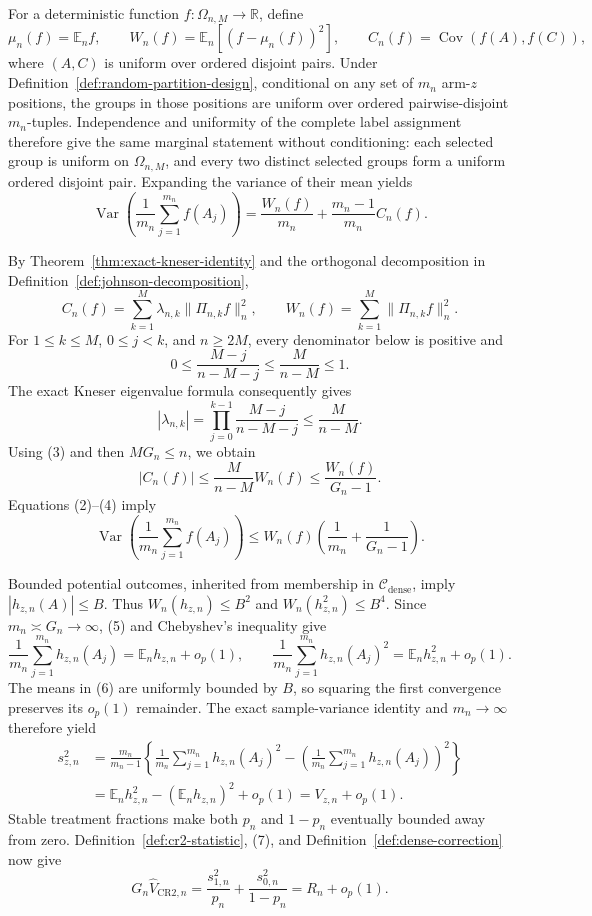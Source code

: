 For a deterministic function \(f:\Omega_{n,M}\to\mathbb R\), define
\[
 \mu_n(f)=\mathbb E_nf,
 \qquad
 W_n(f)=\mathbb E_n\!\left[(f-\mu_n(f))^2\right],
 \qquad
 C_n(f)=\operatorname{Cov}(f(A),f(C)),
 \tag{1}
\]
where \((A,C)\) is uniform over ordered disjoint pairs.  Under Definition~\ref{def:random-partition-design}, conditional on any set of \(m_n\) arm-\(z\) positions, the groups in those positions are uniform over ordered pairwise-disjoint \(m_n\)-tuples.  Independence and uniformity of the complete label assignment therefore give the same marginal statement without conditioning: each selected group is uniform on \(\Omega_{n,M}\), and every two distinct selected groups form a uniform ordered disjoint pair.  Expanding the variance of their mean yields
\[
 \operatorname{Var}\!\left(\frac1{m_n}\sum_{j=1}^{m_n}f(A_j)\right)
 =\frac{W_n(f)}{m_n}+\frac{m_n-1}{m_n}C_n(f).
 \tag{2}
\]

By Theorem~\ref{thm:exact-kneser-identity} and the orthogonal decomposition in Definition~\ref{def:johnson-decomposition},
\[
 C_n(f)=\sum_{k=1}^M\lambda_{n,k}\|\Pi_{n,k}f\|_n^2,
 \qquad
 W_n(f)=\sum_{k=1}^M\|\Pi_{n,k}f\|_n^2.
 \tag{3}
\]
For \(1\le k\le M\), \(0\le j<k\), and \(n\ge2M\), every denominator below is positive and
\[
 0\le\frac{M-j}{n-M-j}\le\frac{M}{n-M}\le1.
\]
The exact Kneser eigenvalue formula consequently gives
\[
 |\lambda_{n,k}|
 =\prod_{j=0}^{k-1}\frac{M-j}{n-M-j}
 \le\frac{M}{n-M}.
\]
Using (3) and then \(MG_n\le n\), we obtain
\[
 |C_n(f)|\le\frac{M}{n-M}W_n(f)
 \le\frac{W_n(f)}{G_n-1}.
 \tag{4}
\]
Equations (2)--(4) imply
\[
 \operatorname{Var}\!\left(\frac1{m_n}\sum_{j=1}^{m_n}f(A_j)\right)
 \le W_n(f)\left(\frac1{m_n}+\frac1{G_n-1}\right).
 \tag{5}
\]

Bounded potential outcomes, inherited from membership in \(\mathcal C_{\mathrm{dense}}\), imply \(|h_{z,n}(A)|\le B\).  Thus \(W_n(h_{z,n})\le B^2\) and \(W_n(h_{z,n}^2)\le B^4\).  Since \(m_n\asymp G_n\to\infty\), (5) and Chebyshev's inequality give
\[
 \frac1{m_n}\sum_{j=1}^{m_n}h_{z,n}(A_j)
   =\mathbb E_nh_{z,n}+o_p(1),
 \qquad
 \frac1{m_n}\sum_{j=1}^{m_n}h_{z,n}(A_j)^2
   =\mathbb E_nh_{z,n}^2+o_p(1).
 \tag{6}
\]
The means in (6) are uniformly bounded by \(B\), so squaring the first convergence preserves its \(o_p(1)\) remainder.  The exact sample-variance identity and \(m_n\to\infty\) therefore yield
\[
 \begin{aligned}
 s_{z,n}^2
 &=\frac{m_n}{m_n-1}\left\{
   \frac1{m_n}\sum_{j=1}^{m_n}h_{z,n}(A_j)^2
   -\left(\frac1{m_n}\sum_{j=1}^{m_n}h_{z,n}(A_j)\right)^2
   \right\}\\
 &=\mathbb E_nh_{z,n}^2-(\mathbb E_nh_{z,n})^2+o_p(1)
 =V_{z,n}+o_p(1).
 \end{aligned}
 \tag{7}
\]
Stable treatment fractions make both \(p_n\) and \(1-p_n\) eventually bounded away from zero.  Definition~\ref{def:cr2-statistic}, (7), and Definition~\ref{def:dense-correction} now give
\[
 G_n\widehat V_{\mathrm{CR2},n}
 =\frac{s_{1,n}^2}{p_n}+\frac{s_{0,n}^2}{1-p_n}
 =R_n+o_p(1).
 \tag{8}
\]

